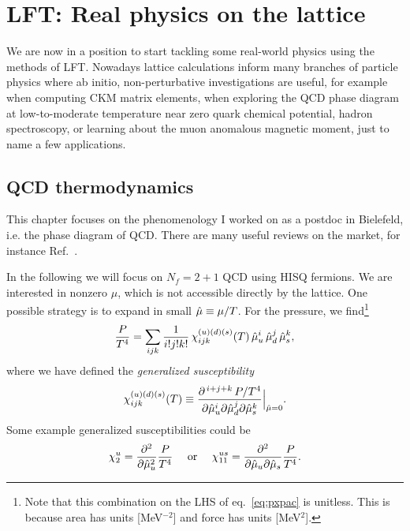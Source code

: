 \chapter{LFT: Real physics on the lattice}

We are now in a position to start tackling some real-world physics using the
methods of LFT. Nowadays lattice calculations inform many branches of particle
physics where ab initio, non-perturbative investigations are useful, for example
when computing CKM matrix elements, when exploring the QCD phase diagram at
low-to-moderate temperature near zero quark chemical potential, hadron
spectroscopy, or learning about the muon anomalous magnetic moment, just to name
a few applications.

\section{QCD thermodynamics}  

This chapter focuses on the phenomenology I worked on as a postdoc in
Bielefeld, i.e. the phase diagram of QCD. There are many useful reviews
on the market, for instance Ref.~\cite{ding_thermodynamics_2015}.

In the following we will focus on $N_f=2+1$ QCD using HISQ fermions. We are
interested in nonzero $\mu$, which is not accessible directly by the lattice.
One possible strategy is to expand in small $\hat{\mu}\equiv\mu/T$. For the
pressure, we find\footnote{Note that this combination on the LHS of 
eq.~\eqref{eq:pxpac} is unitless. This is because area has units
[MeV$^{-2}$] and force has units [MeV$^2$].}
\begin{equation}\label{eq:pxpac}
\frac{P}{T^4}=\sum_{ijk}\frac{1}{i!j!k!}\,\chi_{ijk}^{(u)(d)(s)}(T)\,
               \hat{\mu}_u^i\,\hat{\mu}_d^j\,\hat{\mu}_s^k,
\end{equation}
where we have defined the {\it generalized
susceptibility}
\begin{equation}
\chi_{ijk}^{(u)(d)(s)}(T)
  \equiv\frac{\partial^{\,i+j+k}\,P/T^4}{\partial\hat{\mu}_u^i\partial\hat{\mu}_d^j
                                       \partial\hat{\mu}_s^k}\Big|_{\hat{\mu}=0}.
\end{equation}
Some example generalized susceptibilities could be
\begin{equation}
  \chi_2^u=\frac{\partial^2}{\partial\hat{\mu}_u^2}\frac{P}{T^4}
  ~~~~\text{or}~~~~
  \chi_{11}^{us}=\frac{\partial^2}{\partial\hat{\mu}_u\partial\hat{\mu}_s}\frac{P}{T^4}.
\end{equation}

